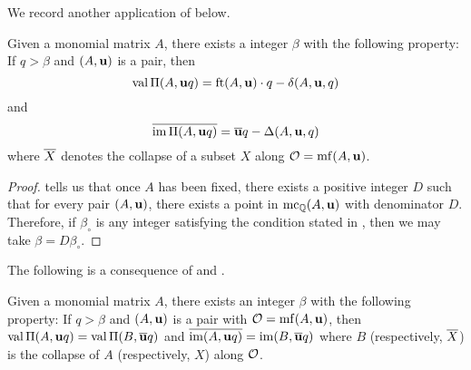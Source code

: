\documentclass[11pt]{amsart}
\begin{document}
We record another application of  below.

\begin{theorem}
\label{uniform uniform value and image: T}
Given a monomial matrix $A$, there exists a integer $\beta$ with the following property:  If $q > \beta$ and $(A, \mathbf{u})$ is a pair, then \[ \operatorname{val} \Pi(A, \mathbf{u}q) = \operatorname{ft}(A, \mathbf{u}) \cdot q - \delta(A, \mathbf{u}, q) \] and
\[ \overline{ \operatorname{im} \Pi(A, \mathbf{u}q)} = \overline{\mathbf{u}}q - \Delta(A, \mathbf{u},q) \] where $\overline{X}$ denotes the collapse of a subset $X$ along $\mathcal{O} = \operatorname{mf}(A, \mathbf{u})$.
\end{theorem}

\begin{proof}  
  tells us that once $A$ has been fixed, there exists a positive integer $D$ such that for every pair $(A, \mathbf{u})$, there exists a point in $\operatorname{mc}_{\mathbb{Q}}(A, \mathbf{u})$ with denominator $D$.  Therefore, if $\beta_{\circ}$  is any integer satisfying the condition stated in , then we may take $\beta = D \beta_{\circ}$.  
\end{proof}

The following is a consequence of  and .

\begin{corollary}
Given a monomial matrix $A$, there exists an integer $\beta$ with the following property\textup:  If $q > \beta$ and $(A, \mathbf{u})$ is a pair with $\mathcal{O} = \operatorname{mf}(A, \mathbf{u})$, then $\operatorname{val} \Pi(A, \mathbf{u}q) = \operatorname{val} \Pi(B, \overline{\mathbf{u}}q)$ and $\overline{ \operatorname{im}(A, \mathbf{u}q)} = \operatorname{im}(B, \overline{\mathbf{u}}q)$ where $B$ (respectively, $\overline{X}$) is the collapse of $A$  (respectively, $X$) along $\mathcal{O}$.
\end{corollary}



\newpage
\end{document}
